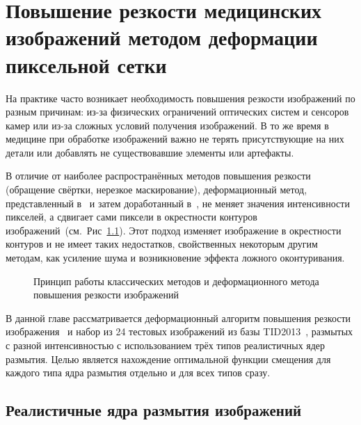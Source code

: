 \chapter{Повышение резкости медицинских изображений методом деформации пиксельной сетки}\label{ch:ch2}

На практике часто возникает необходимость повышения резкости изображений по разным причинам: из-за физических ограничений оптических систем и сенсоров камер или из-за сложных условий получения изображений. В то же время в медицине при обработке изображений важно не терять присутствующие на них детали или добавлять не существовавшие элементы или артефакты.

В отличие от наиболее распространённых методов повышения резкости (обращение свёртки, нерезкое маскирование), деформационный метод, представленный в~\cite{krylov2014gridwarping} и затем доработанный в~\cite{nasonova2014deblurred, gusev2016parallel}, не меняет значения интенсивности пикселей, а сдвигает сами пиксели в окрестности контуров изображений~(см.~Рис~\ref{fig:warping-warping-idea}). Этот подход изменяет изображение в окрестности контуров и не имеет таких недостатков, свойственных некоторым другим методам, как усиление шума и возникновение эффекта ложного оконтуривания.

\begin{figure}[ht]
	\caption{Принцип работы классических методов и деформационного метода повышения резкости изображений}
	\label{fig:warping-warping-idea}
\end{figure}

В данной главе рассматривается деформационный алгоритм повышения резкости изображения~\cite{nasonova2014deblurred, gusev2016parallel} и набор из 24 тестовых изображений из базы TID2013~\cite{ponomarenko2015image}, размытых с разной интенсивностью с использованием трёх типов реалистичных ядер размытия. Целью является нахождение оптимальной функции смещения для каждого типа ядра размытия отдельно и для всех типов сразу.

\section{Реалистичные ядра размытия изображений}

